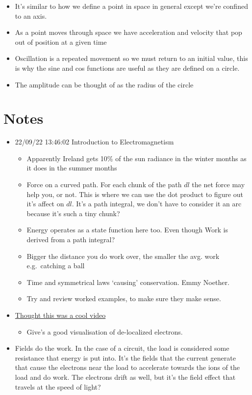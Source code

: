 \documentclass[11pt]{article}
\begin{document}
\begin{itemize}
\tightlist
\item
  It's similar to how we define a point in space in general except we're
  confined to an axis.
\item
  As a point moves through space we have acceleration and velocity that
  pop out of position at a given time
\item
  Oscillation is a repeated movement so we must return to an initial
  value, this is why the sine and cos functions are useful as they are
  defined on a circle.
\item
  The amplitude can be thought of as the radius of the circle
\end{itemize}

\hypertarget{notes}{%
\section{Notes}\label{notes}}

\begin{itemize}
\tightlist
\item
  22/09/22 13:46:02 Introduction to Electromagnetism

  \begin{itemize}
  \tightlist
  \item
    Apparently Ireland gets 10\% of the sun radiance in the winter
    months as it does in the summer months
  \item
    Force on a curved path. For each chunk of the path \(dl\) the net
    force may help you, or not. This is where we can use the dot product
    to figure out it's affect on \(dl\). It's a path integral, we don't
    have to consider it an arc because it's such a tiny chunk?
  \item
    Energy operates as a state function here too. Even though Work is
    derived from a path integral?
  \item
    Bigger the distance you do work over, the smaller the avg. work
    e.g.~catching a ball
  \item
    Time and symmetrical laws `causing' conservation. Emmy Noether.
  \item
    Try and review worked examples, to make sure they make sense.
  \end{itemize}
\item
  \href{https://www.youtube.com/watch?v=KGJqykotjog}{Thought this was a
  cool video}

  \begin{itemize}
  \tightlist
  \item
    Give's a good visualisation of de-localized electrons.
  \end{itemize}
\item
  Fields do the work. In the case of a circuit, the load is considered
  some resistance that energy is put into. It's the fields that the
  current generate that cause the electrons near the load to accelerate
  towards the ions of the load and do work. The electrons drift as well,
  but it's the field effect that travels at the speed of light?
\end{itemize}
\end{document}
